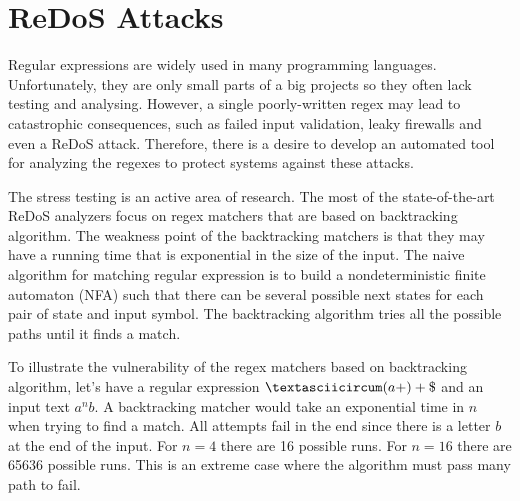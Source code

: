 \documentclass[acmsmall,screen]{acmart}
\begin{document}
\section{ReDoS Attacks}\label{sec:redos}
Regular expressions are widely used in many programming languages.
%
Unfortunately, they are only small parts of a big projects so they often lack testing and analysing.
%
However, a single poorly-written regex may lead to catastrophic consequences, such as failed input validation, leaky firewalls and 
%
even a ReDoS attack.
% 
Therefore, there is a desire to develop an automated tool for analyzing the regexes to protect systems against these attacks.
%



The stress testing is an active area of research.
%
The most of the state-of-the-art ReDoS analyzers focus on regex matchers that are based on backtracking algorithm.
%
The weakness point of the backtracking
matchers is that they may have a running time that is exponential in the size of the input.
%
The naive algorithm for matching regular expression is to build a nondeterministic finite automaton (NFA) such that there can
be several possible next states for each pair of state and input symbol. 
%
The backtracking algorithm tries all the possible paths until it finds a match.


\begin{example}
To illustrate the vulnerability of the regex matchers based on backtracking algorithm, let's have a regular expression $\textasciicircum(a+)+\$$
and an input text $a^nb$.
%
A backtracking matcher would take an exponential time in $n$ when trying to find a match.
%
All attempts fail in the end since there is a letter $b$ at the end of the input.
%
For $n=4$ there are 16 possible runs. 
%
For $n=16$ there are 65636 possible runs. 
%
This is an extreme case where the algorithm must pass many path to fail.
\end{example}
\end{document}
